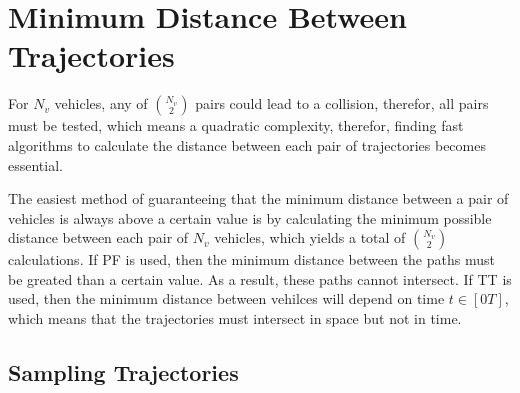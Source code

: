 \section{Minimum Distance Between Trajectories}
\par For $N_v$ vehicles, any of ${N_v \choose 2}$ pairs could lead to a collision, therefor, all pairs must be tested, which means a quadratic complexity, therefor, finding fast algorithms to calculate the distance between each pair of trajectories becomes essential.
\par The easiest method of guaranteeing that the minimum distance between a pair of vehicles is always above a certain value is by calculating the minimum possible distance between each pair of $N_v$ vehicles, which yields a total of ${N_v \choose 2}$ calculations. If \ac{PF} is used, then the minimum distance between the paths must be greated than a certain value. As a result, these paths cannot intersect. If \ac{TT} is used, then the minimum distance between vehilces will depend on time $t \in [0 T]$, which means that the trajectories must intersect in space but not in time. 

\subsection{Sampling Trajectories}

